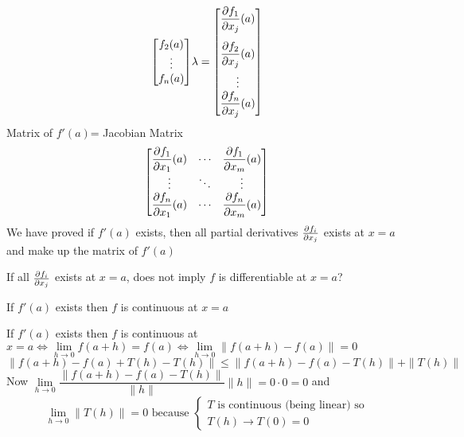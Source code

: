 \begin{myproof}
\begin{align*}
{\begin{bmatrix}
				                                             f_2(a) \\
				                                             \vdots \\
				                                             f_n(a)
			                                             \end{bmatrix}}{\lambda} =\begin{bmatrix}
			                                                                  \dfrac{\partial f_1}{\partial x_j}(a) \\[5mm]
			                                                                  \dfrac{\partial f_2}{\partial x_j}(a) \\[3mm]
			                                                                  \vdots             \\
			                                                                  \dfrac{\partial f_n}{\partial x_j}(a)
		                                                                  \end{bmatrix}
	\end{align*}Matrix of $f'(a)$= Jacobian Matrix $$\begin{bmatrix}
			\dfrac{\partial f_1}{\partial x_1}(a) & \cdots & \dfrac{\partial f_1}{\partial x_m}(a) \\
			\vdots             & \ddots & \vdots             \\
			\dfrac{\partial f_n}{\partial x_1}(a) & \cdots & \dfrac{\partial f_n}{\partial x_m}(a)
		\end{bmatrix}$$We have proved if $f'(a)$ exists, then  all partial derivatives  $\frac{\partial f_i}{\partial x_j}$ exists at $x=a$ and make up the matrix  of $f'(a)$
\end{myproof}
If all $\frac{\partial f_i}{\partial x_j}$ exists at $x=a$, does not imply  $f$ is differentiable at $x=a$?
\begin{Theorem}{}{}
	If $f'(a)$ exists then $f$ is continuous at $x=a$
\end{Theorem}
\begin{myproof}
	If $f'(a)$ exists then $f$ is continuous at $x=a\iff\lim\limits_{h\to 0}f(a+h)=f(a)\iff\lim\limits_{h\to 0}\|f(a+h)-f(a)\|=0$
	$$\|f(a+h)-f(a)+T(h)-T(h)\|\leq \|f(a+h)-f(a)-T(h)\|+\|T(h)\|$$Now $\lim\limits_{h\to 0}\dfrac{\|f(a+h)-f(a)-T(h)\|}{\|h\|}\|h\|=0\cdot 0=0$ and $$\lim_{h\to 0}\|T(h)\|=0\text{ because }\begin{cases*}
			T\text{ is continuous (being linear) so} \\
			T(h)\to T(0)=0
		\end{cases*}$$
\end{myproof}